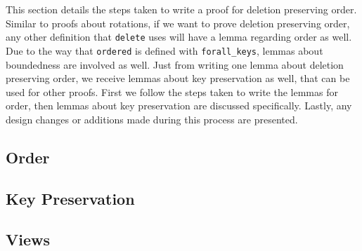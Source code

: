 This section details the steps taken to write a proof for deletion preserving order. Similar to proofs about rotations, if we want to prove deletion preserving order, any other definition that \lstinline{delete} uses will have a lemma regarding order as well. Due to the way that \lstinline{ordered} is defined with \lstinline{forall_keys}, lemmas about boundedness are involved as well. Just from writing one lemma about deletion preserving order, we receive lemmas about key preservation as well, that can be used for other proofs. First we follow the steps taken to write the lemmas for order, then lemmas about key preservation are discussed specifically. Lastly, any design changes or additions made during this process are presented.

\subsection*{Order}


\subsection*{Key Preservation}


\subsection*{Views}

